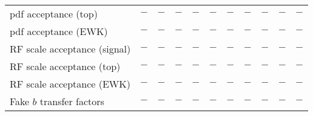 {\begin{tabular}{l|c|c|cccccccc}
pdf acceptance (top)         & $-$ & $-$ & $-$        & $-$        & $-$          & $-$                & $-$                 & $-$          & $-$    & $-$     \\ 
pdf acceptance (EWK)         & $-$ & $-$ & $-$        & $-$        & $-$          & $-$                & $-$                 & $-$          & $-$    & $-$     \\ 
RF scale acceptance (signal) & $-$ & $-$ & $-$        & $-$        & $-$          & $-$                & $-$                 & $-$          & $-$    & $-$     \\ 
RF scale acceptance (top)    & $-$ & $-$ & $-$        & $-$        & $-$          & $-$                & $-$                 & $-$          & $-$    & $-$     \\ 
RF scale acceptance (EWK)    & $-$ & $-$ & $-$        & $-$        & $-$          & $-$                & $-$                 & $-$          & $-$    & $-$     \\ 
Fake $b$ transfer factors    & $-$ & $-$ & $-$        & $-$        & $-$          & $-$                & $-$                 & $-$          & $-$    & $-$     \\ 
\hline
\end{tabular}
}
\renewcommand{\arraystretch}{1}
